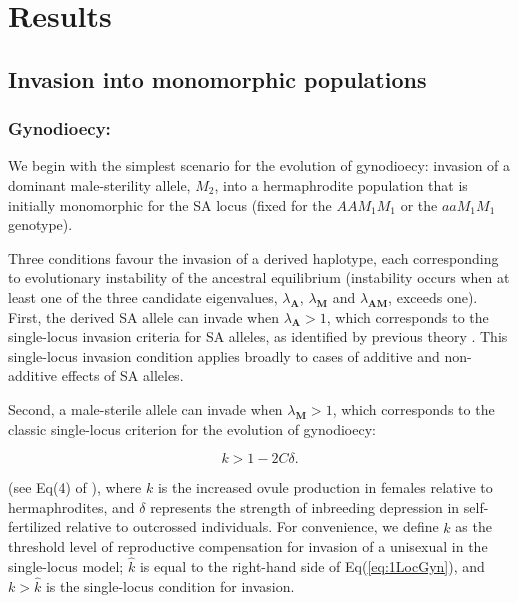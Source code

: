 \documentclass{article}
\begin{document}
\section*{Results}

\subsection*{Invasion into monomorphic populations}

\subsubsection*{Gynodioecy:} We begin with the simplest scenario for the evolution of gynodioecy: invasion of a dominant male-sterility allele, $M_2$, into a hermaphrodite population that is initially monomorphic for the SA locus (fixed for the $AAM_1M_1$ or the $aaM_1M_1$ genotype).  

Three conditions favour the invasion of a derived haplotype, each corresponding to evolutionary instability of the ancestral equilibrium (instability occurs when at least one of the three candidate eigenvalues, $\lambda_{\mathbf{A}}$, $\lambda_{\mathbf{M}}$ and $\lambda_{\mathbf{AM}}$, exceeds one). First, the derived SA allele can invade when $\lambda_{\mathbf{A}} > 1$, which corresponds to the single-locus invasion criteria for SA alleles, as identified by previous theory \citep{Kidwell1977, JordanConnallon2014, Olito2016}. This single-locus invasion condition applies broadly to cases of additive and non-additive effects of SA alleles. 

Second, a male-sterile allele can invade when $\lambda_{\mathbf{M}} > 1$, which corresponds to the classic single-locus criterion for the evolution of gynodioecy:

\begin{equation}\label{eq:1LocGyn}
	k > 1 - 2 C \delta.
\end{equation}

\noindent (see Eq(4) of \citealt{Charlesworth1978a}), where $k$ is the increased ovule production in females relative to hermaphrodites, and $\delta$ represents the strength of inbreeding depression in self-fertilized relative to outcrossed individuals. For convenience, we define $\hat{k}$ as the threshold level of reproductive compensation for invasion of a unisexual in the single-locus model; $\hat{k}$ is equal to the right-hand side of Eq(\ref{eq:1LocGyn}), and $k > \hat{k}$ is the single-locus condition for invasion.
\end{document}
